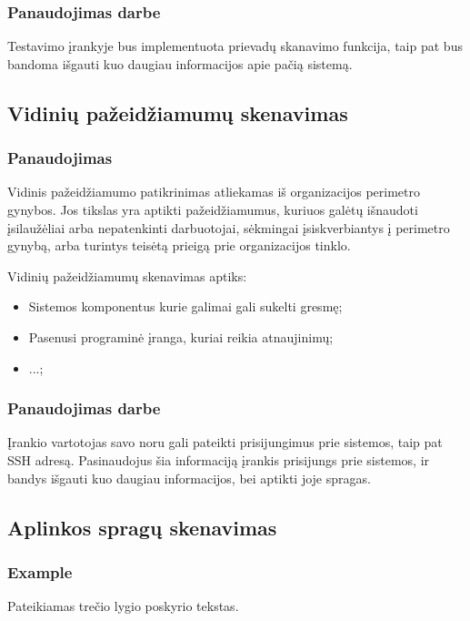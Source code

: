 \documentclass[a4paper,12pt,fleqn]{article}
\begin{document}
\subsubsection{Panaudojimas darbe}
\label{sec:data}
Testavimo įrankyje bus implementuota prievadų skanavimo funkcija, taip pat bus bandoma išgauti kuo daugiau informacijos apie pačią sistemą.

\subsection{Vidinių pažeidžiamumų skenavimas}
\label{sec:example}

\subsubsection{Panaudojimas}
Vidinis pažeidžiamumo patikrinimas atliekamas iš organizacijos perimetro gynybos. Jos tikslas yra aptikti pažeidžiamumus, kuriuos galėtų išnaudoti įsilaužėliai arba nepatenkinti darbuotojai, sėkmingai įsiskverbiantys į perimetro gynybą, arba turintys teisėtą prieigą prie organizacijos tinklo.

Vidinių pažeidžiamumų skenavimas aptiks:
\begin{itemize}
	\item Sistemos komponentus kurie galimai gali sukelti gresmę;
	\item Pasenusi programinė įranga, kuriai reikia atnaujinimų;
	\item ...;
\end{itemize}

\subsubsection{Panaudojimas darbe}
\label{sec:data}
Įrankio vartotojas savo noru gali pateikti prisijungimus prie sistemos, taip pat SSH adresą. Pasinaudojus šia informaciją įrankis prisijungs prie sistemos, ir bandys išgauti kuo daugiau informacijos, bei aptikti joje spragas.

\subsection{Aplinkos spragų skenavimas}
\label{sec:example}

\subsubsection{Example}
\label{sec:data}
Pateikiamas trečio lygio poskyrio tekstas.
\end{document}
